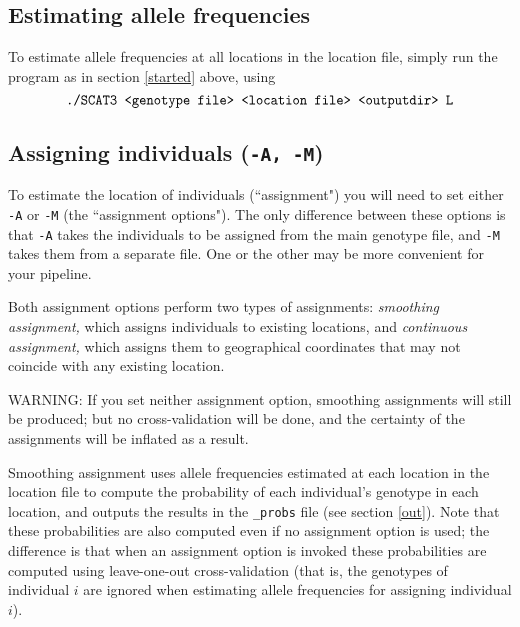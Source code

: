 \documentclass[10pt,titlepage,times,letterpaper]{article}
\begin{document}
\subsection{Estimating allele frequencies}

To estimate allele frequencies at all locations in the location
file, simply run the program as in section \ref{started} above,
using
$$\text{{\tt ./SCAT3 <genotype file> <location file> <outputdir> L}}$$

\subsection{Assigning individuals ({\tt -A, -M})}  \label{assign}

To estimate the location of individuals (``assignment") you will need
to set either {\tt -A} or {\tt -M} (the ``assignment options").  The
only difference between these options is that {\tt -A} takes the
individuals to be assigned from the main genotype file, and {\tt -M}
takes them from a separate file.  One or the other may be more
convenient for your pipeline.  

Both assignment options perform two types of assignments: {\it smoothing
 assignment,} which assigns individuals to existing locations, and 
{\it continuous assignment,} which
assigns them to geographical coordinates that may not coincide with any
existing location. 

WARNING:  If you set neither assignment option, smoothing assignments
will still be produced; but no cross-validation will be done, and the certainty of
the assignments will be inflated as a result.

Smoothing assignment uses allele frequencies estimated at each
location in the location file to compute the probability of each
individual's genotype in each location, and outputs the results in the
{\tt \_probs} file (see section \ref{out}). Note that these
probabilities are also computed even if no assignment option is
used; the difference is that when an assignment option is invoked these
probabilities are computed using leave-one-out cross-validation 
(that is, the genotypes of individual $i$ are ignored when estimating allele
frequencies for assigning individual $i$).
\end{document}
